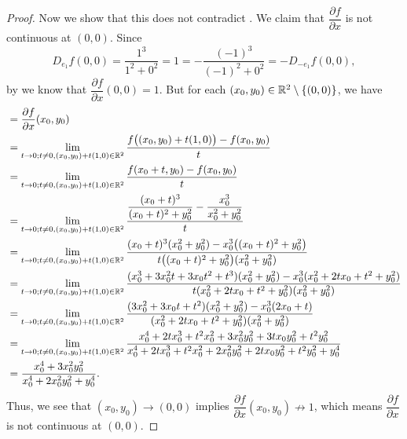 \begin{proof}
  Now we show that this does not contradict .
  We claim that \(\dfrac{\partial f}{\partial x}\) is not continuous at \((0, 0)\).
  Since
  \[
    D_{e_1} f(0, 0) = \dfrac{1^3}{1^2 + 0^2} = 1 = -\dfrac{(-1)^3}{(-1)^2 + 0^2} = -D_{-e_1} f(0, 0),
  \]
  by  we know that \(\dfrac{\partial f}{\partial x}(0, 0) = 1\).
  But for each \((x_0, y_0) \in \mathbb{R}^2 \setminus \left\lbrace(0, 0)\right\rbrace\), we have
  \begin{align*}
     & = \dfrac{\partial f}{\partial x}(x_0, y_0)                                                                                                                                                                                      \\
     & = \lim_{t \to 0 ; t \neq 0, (x_0, y_0) + t(1, 0) \in \mathbb{R}^2} \dfrac{f\big((x_0, y_0) + t(1, 0)\big) - f(x_0, y_0)}{t}                                                                                                             \\
     & = \lim_{t \to 0 ; t \neq 0, (x_0, y_0) + t(1, 0) \in \mathbb{R}^2} \dfrac{f(x_0 + t, y_0) - f(x_0, y_0)}{t}                                                                                                                             \\
     & = \lim_{t \to 0 ; t \neq 0, (x_0, y_0) + t(1, 0) \in \mathbb{R}^2} \dfrac{\dfrac{(x_0 + t)^3}{(x_0 + t)^2 + y_0^2} - \dfrac{x_0^3}{x_0^2 + y_0^2}}{t}                                                                                   \\
     & = \lim_{t \to 0 ; t \neq 0, (x_0, y_0) + t(1, 0) \in \mathbb{R}^2} \dfrac{(x_0 + t)^3 (x_0^2 + y_0^2) - x_0^3 \big((x_0 + t)^2 + y_0^2\big)}{t \big((x_0 + t)^2 + y_0^2\big) (x_0^2 + y_0^2)}                                           \\
     & = \lim_{t \to 0 ; t \neq 0, (x_0, y_0) + t(1, 0) \in \mathbb{R}^2} \dfrac{(x_0^3 + 3 x_0^2 t + 3 x_0 t^2 + t^3) (x_0^2 + y_0^2) - x_0^3 (x_0^2 + 2 t x_0 + t^2 + y_0^2)}{t (x_0^2 + 2 t x_0 + t^2 + y_0^2) (x_0^2 + y_0^2)}             \\
     & = \lim_{t \to 0 ; t \neq 0, (x_0, y_0) + t(1, 0) \in \mathbb{R}^2} \dfrac{(3 x_0^2 + 3 x_0 t + t^2) (x_0^2 + y_0^2) - x_0^3 (2 x_0 + t)}{(x_0^2 + 2 t x_0 + t^2 + y_0^2) (x_0^2 + y_0^2)}                                               \\
     & = \lim_{t \to 0 ; t \neq 0, (x_0, y_0) + t(1, 0) \in \mathbb{R}^2} \dfrac{x_0^4 + 2 t x_0^3 + t^2 x_0^2 + 3 x_0^2 y_0^2 + 3 t x_0 y_0^2 + t^2 y_0^2}{x_0^4 + 2 t x_0^3 + t^2 x_0^2 + 2 x_0^2 y_0^2 + 2 t x_0 y_0^2 + t^2 y_0^2 + y_0^4} \\
     & = \dfrac{x_0^4 + 3 x_0^2 y_0^2}{x_0^4 + 2 x_0^2 y_0^2 + y_0^4}.
  \end{align*}
  Thus, we see that \((x_0, y_0) \to (0, 0)\) implies \(\dfrac{\partial f}{\partial x}(x_0, y_0) \not\to 1\), which means \(\dfrac{\partial f}{\partial x}\) is not continuous at \((0, 0)\).
\end{proof}


